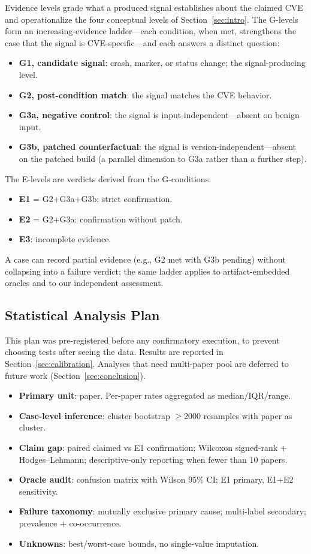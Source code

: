 \documentclass[11pt]{article}
\begin{document}
Evidence levels grade what a produced signal establishes about the claimed CVE and operationalize the four conceptual levels of Section~\ref{sec:intro}. The G-levels form an increasing-evidence ladder---each condition, when met, strengthens the case that the signal is CVE-specific---and each answers a distinct question:
\begin{itemize}
\item \textbf{G1, candidate signal}: crash, marker, or status change; the signal-producing level.
\item \textbf{G2, post-condition match}: the signal matches the CVE behavior.
\item \textbf{G3a, negative control}: the signal is input-independent---absent on benign input.
\item \textbf{G3b, patched counterfactual}: the signal is version-independent---absent on the patched build (a parallel dimension to G3a rather than a further step).
\end{itemize}
The E-levels are verdicts derived from the G-conditions:
\begin{itemize}
\item \textbf{E1} = G2+G3a+G3b: strict confirmation.
\item \textbf{E2} = G2+G3a: confirmation without patch.
\item \textbf{E3}: incomplete evidence.
\end{itemize}
A case can record partial evidence (e.g., G2 met with G3b pending) without collapsing into a failure verdict; the same ladder applies to artifact-embedded oracles and to our independent assessment.

\subsection{Statistical Analysis Plan}
This plan was pre-registered before any confirmatory execution, to prevent choosing tests after seeing the data. Results are reported in Section~\ref{sec:calibration}. Analyses that need multi-paper pool are deferred to future work (Section~\ref{sec:conclusion}).
\begin{itemize}
\item \textbf{Primary unit}: paper. Per-paper rates aggregated as median/IQR/range.
\item \textbf{Case-level inference}: cluster bootstrap $\geq$2000 resamples with paper as cluster.
\item \textbf{Claim gap}: paired claimed vs E1 confirmation; Wilcoxon signed-rank + Hodges--Lehmann; descriptive-only reporting when fewer than 10 papers.
\item \textbf{Oracle audit}: confusion matrix with Wilson 95\% CI; E1 primary, E1+E2 sensitivity.
\item \textbf{Failure taxonomy}: mutually exclusive primary cause; multi-label secondary; prevalence + co-occurrence.
\item \textbf{Unknowns}: best/worst-case bounds, no single-value imputation.
\end{itemize}
\end{document}
